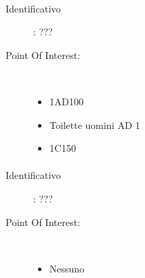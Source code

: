 \documentclass[../SperimentazioniPratiche.tex]{subfiles}
\begin{document}
			\paragraph*{}
			\label{01003}
			\begin{tcolorbox}[fonttitle=\bfseries, 
								adjusted title={\Large Beacon 01003},
								sharp corners=south,
								colback=white, 
								colframe=white!50!blue!75!black]
								
				\begin{description}
					\item[Identificativo]: ???

					\tcbline					
					
					\item[Point Of Interest:] \ \par
					\begin{itemize}
						\item 1AD100
						\item Toilette uomini AD 1
						\item 1C150
					\end{itemize}					   				
				\end{description}  				
			\end{tcolorbox}
			
			\paragraph*{}
			\label{01004}
			\begin{tcolorbox}[fonttitle=\bfseries, 
								adjusted title={\Large Beacon 01004},
								sharp corners=south,
								colback=white, 
								colframe=white!50!blue!75!black]
								
				\begin{description}
					\item[Identificativo]: ???

					\tcbline					
					
					\item[Point Of Interest:] \ \par
					\begin{itemize}
						\item Nessuno
					\end{itemize}					   				
				\end{description}  				
			\end{tcolorbox}
			
\end{document}
